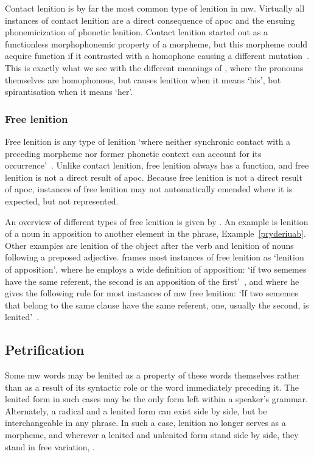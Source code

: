 Contact lenition is by far the most common type of lenition in \gls{mw}. Virtually all instances of contact lenition are a direct consequence of \gls{apoc} and the ensuing phonemicization of phonetic lenition. Contact lenition started out as a functionless morphophonemic property of a morpheme,  but this morpheme could acquire function if it contrasted with a homophone causing a different mutation~\autocite[1]{schrijver_free_2010}. This is exactly what we see with the different meanings of , where the pronouns themselves are homophonous, but  causes lenition when it means `his', but spirantisation when it means `her'.

\subsubsection{Free lenition}
\label{sec:free-lenition}
Free lenition is any type of lenition `where neither synchronic contact with a preceding morpheme nor former phonetic context can account for its occurrence'~\autocite[1]{schrijver_free_2010}. Unlike contact lenition, free lenition always has a function, and free lenition is not a direct result of \gls{apoc}. Because free lenition is not a direct result of \gls{apoc}, instances of free lenition may not automatically emended where it is expected, but not represented.

An overview of different types of free lenition is given by \textcite{schrijver_free_2010}. An example is lenition of a noun in apposition to another element in the phrase, \eg Example~\ref{pryderiuab}.
Other examples are lenition of the object after the verb and lenition of nouns following a preposed adjective.
\Textcite{schrijver_free_2010} frames most instances of free lenition  as `lenition of apposition', where he employs a wide definition of apposition: `if two sememes have the same referent, the second is an apposition of the first'~\autocite[3]{schrijver_free_2010}, and where he gives the following rule for most instances of \gls{mw} free lenition: `If two sememes that belong to the same clause have the same referent, one, usually the second, is lenited'~\autocite[3]{schrijver_free_2010}.

\subsection{Petrification}
\label{sec:petrification}
Some \gls{mw} words may be lenited as a property of these words themselves rather than as a result of its syntactic role or the word immediately preceding it.
The lenited form in such cases may be the only form left within a speaker's grammar.
Alternately, a radical and a lenited form can exist side by side, but be interchangeable in any phrase. In such a case, lenition no longer serves as a morpheme, and wherever a lenited and unlenited form stand side by side, they stand in free variation, \eg {}.

